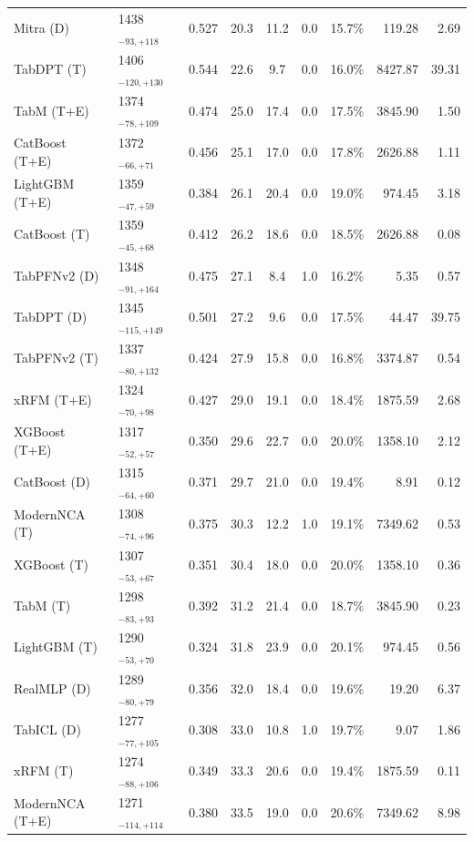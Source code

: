 \begin{tabular}{llcccccrr}
Mitra (D) & 1438${}_{-93,+118}$ & 0.527 & 20.3 & 11.2 & 0.0 & 15.7\% & 119.28 & 2.69 \\
TabDPT (T) & 1406${}_{-120,+130}$ & 0.544 & 22.6 & 9.7 & 0.0 & 16.0\% & 8427.87 & 39.31 \\
TabM (T+E) & 1374${}_{-78,+109}$ & 0.474 & 25.0 & 17.4 & 0.0 & 17.5\% & 3845.90 & 1.50 \\
CatBoost (T+E) & 1372${}_{-66,+71}$ & 0.456 & 25.1 & 17.0 & 0.0 & 17.8\% & 2626.88 & 1.11 \\
LightGBM (T+E) & 1359${}_{-47,+59}$ & 0.384 & 26.1 & 20.4 & 0.0 & 19.0\% & 974.45 & 3.18 \\
CatBoost (T) & 1359${}_{-45,+68}$ & 0.412 & 26.2 & 18.6 & 0.0 & 18.5\% & 2626.88 & 0.08 \\
TabPFNv2 (D) & 1348${}_{-91,+164}$ & 0.475 & 27.1 & 8.4 & 1.0 & 16.2\% & 5.35 & 0.57 \\
TabDPT (D) & 1345${}_{-115,+149}$ & 0.501 & 27.2 & 9.6 & 0.0 & 17.5\% & 44.47 & 39.75 \\
TabPFNv2 (T) & 1337${}_{-80,+132}$ & 0.424 & 27.9 & 15.8 & 0.0 & 16.8\% & 3374.87 & 0.54 \\
xRFM (T+E) & 1324${}_{-70,+98}$ & 0.427 & 29.0 & 19.1 & 0.0 & 18.4\% & 1875.59 & 2.68 \\
XGBoost (T+E) & 1317${}_{-52,+57}$ & 0.350 & 29.6 & 22.7 & 0.0 & 20.0\% & 1358.10 & 2.12 \\
CatBoost (D) & 1315${}_{-64,+60}$ & 0.371 & 29.7 & 21.0 & 0.0 & 19.4\% & 8.91 & 0.12 \\
ModernNCA (T) & 1308${}_{-74,+96}$ & 0.375 & 30.3 & 12.2 & 1.0 & 19.1\% & 7349.62 & 0.53 \\
XGBoost (T) & 1307${}_{-53,+67}$ & 0.351 & 30.4 & 18.0 & 0.0 & 20.0\% & 1358.10 & 0.36 \\
TabM (T) & 1298${}_{-83,+93}$ & 0.392 & 31.2 & 21.4 & 0.0 & 18.7\% & 3845.90 & 0.23 \\
LightGBM (T) & 1290${}_{-53,+70}$ & 0.324 & 31.8 & 23.9 & 0.0 & 20.1\% & 974.45 & 0.56 \\
RealMLP (D) & 1289${}_{-80,+79}$ & 0.356 & 32.0 & 18.4 & 0.0 & 19.6\% & 19.20 & 6.37 \\
TabICL (D) & 1277${}_{-77,+105}$ & 0.308 & 33.0 & 10.8 & 1.0 & 19.7\% & 9.07 & 1.86 \\
xRFM (T) & 1274${}_{-88,+106}$ & 0.349 & 33.3 & 20.6 & 0.0 & 19.4\% & 1875.59 & 0.11 \\
ModernNCA (T+E) & 1271${}_{-114,+114}$ & 0.380 & 33.5 & 19.0 & 0.0 & 20.6\% & 7349.62 & 8.98 \\

\end{tabular}
